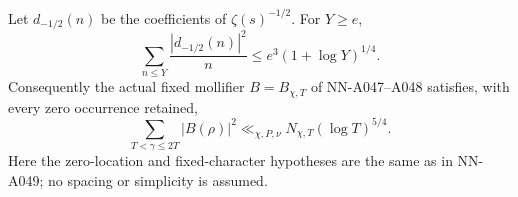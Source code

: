 \begin{lemma}
\label{lem:A049-fractionalnorm}
Let \(d_{-1/2}(n)\) be the coefficients of \(\zeta(s)^{-1/2}\).
For \(Y\ge e\),
\begin{equation}\label{eq:A049-fractionalnorm}
 \sum_{n\le Y}\frac{|d_{-1/2}(n)|^2}{n}
                         \le e^3(1+\log Y)^{1/4}.
\end{equation}
Consequently the actual fixed mollifier \(B=B_{\chi,T}\) of
NN-A047--A048 satisfies, with every zero occurrence retained,
\begin{equation}\label{eq:A049-fractionalsampling}
             \sum_{T<\gamma\le2T}|B(\rho)|^2
                  \ll_{\chi,P,\nu}N_{\chi,T}(\log T)^{5/4}.
\end{equation}
Here the zero-location and fixed-character hypotheses are the
same as in NN-A049; no spacing or simplicity is assumed.
\end{lemma}


